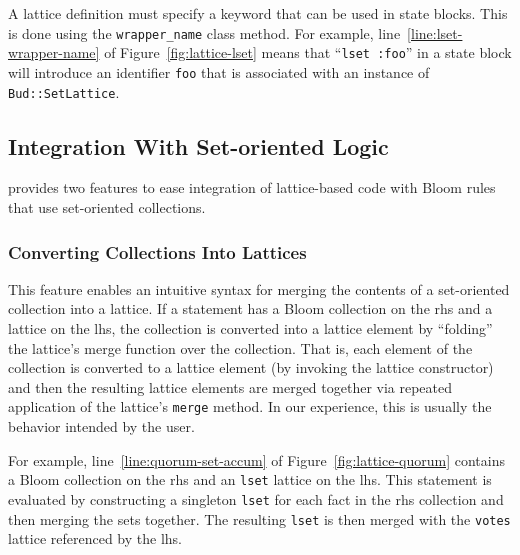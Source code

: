 
A lattice definition must specify a keyword that can be used in \lang state
blocks. This is done using the \texttt{wrapper\_name} class method. For example,
line~\ref{line:lset-wrapper-name} of Figure~\ref{fig:lattice-lset} means that
``\texttt{lset :foo}'' in a state block will introduce an identifier
\texttt{foo} that is associated with an instance of \texttt{Bud::SetLattice}.

\subsection{Integration With Set-oriented Logic}
\label{sec:bloom-interop}
\lang provides two features to ease integration of lattice-based code with Bloom
rules that use set-oriented collections.

\subsubsection{Converting Collections Into Lattices}
This feature enables an intuitive syntax for merging the contents of a
set-oriented collection into a lattice. If a statement has a Bloom collection on
the rhs and a lattice on the lhs, the collection is converted into a lattice
element by ``folding'' the lattice's merge function over the collection. That
is, each element of the collection is converted to a lattice element (by
invoking the lattice constructor) and then the resulting lattice elements are
merged together via repeated application of the lattice's \texttt{merge}
method. In our experience, this is usually the behavior intended by the user.

For example, line~\ref{line:quorum-set-accum} of Figure~\ref{fig:lattice-quorum}
contains a Bloom collection on the rhs and an \texttt{lset} lattice on the
lhs. This statement is evaluated by constructing a singleton \texttt{lset} for
each fact in the rhs collection and then merging the sets together. The
resulting \texttt{lset} is then merged with the \texttt{votes} lattice
referenced by the lhs.

